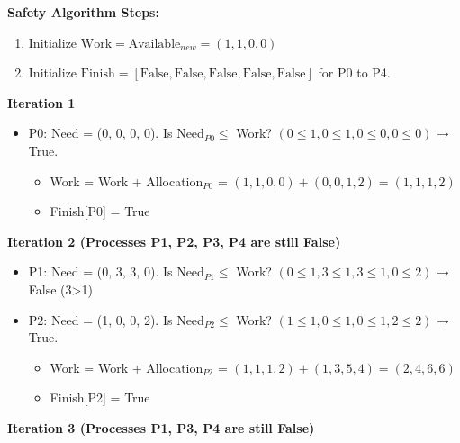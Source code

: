 \documentclass[../main.tex]{subfiles}
\begin{document}
\medskip

\textbf{Safety Algorithm Steps:}

\begin{enumerate}
    \item Initialize $\text{Work} = \text{Available}_{new} = (1, 1, 0, 0)$
    \item Initialize $\text{Finish} = [\text{False}, \text{False}, \text{False}, \text{False}, \text{False}]$ for P0 to P4.
\end{enumerate}

\textbf{Iteration 1}

\begin{itemize}
    \item P0: Need = (0, 0, 0, 0). Is Need$_{P0} \le$ Work? $(0\le1, 0\le1, 0\le0, 0\le0)$ → True.
        \begin{itemize}
            \item Work = Work + Allocation$_{P0}$ = $(1,1,0,0) + (0,0,1,2) = (1,1,1,2)$  
            \item Finish[P0] = True
        \end{itemize}
\end{itemize}

\textbf{Iteration 2 (Processes P1, P2, P3, P4 are still False)}

\begin{itemize}
    \item P1: Need = (0, 3, 3, 0). Is Need$_{P1} \le$ Work? $(0\le1, 3\le1, 3\le1, 0\le2)$ → False (3>1)
    \item P2: Need = (1, 0, 0, 2). Is Need$_{P2} \le$ Work? $(1\le1, 0\le1, 0\le1, 2\le2)$ → True.
        \begin{itemize}
            \item Work = Work + Allocation$_{P2}$ = $(1,1,1,2) + (1,3,5,4) = (2,4,6,6)$  
            \item Finish[P2] = True
        \end{itemize}
\end{itemize}

\textbf{Iteration 3 (Processes P1, P3, P4 are still False)}
\end{document}

